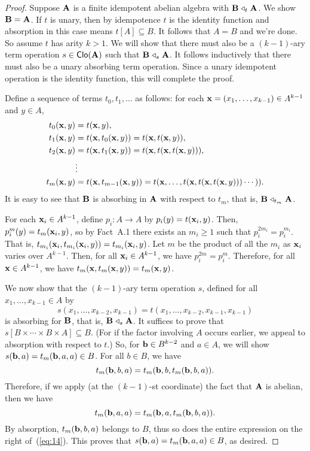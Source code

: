\begin{proof}
  Suppose $\mathbf{A}$ is a finite idempotent abelian algebra with $\mathbf{B} \mathrel{\triangleleft}_t \mathbf{A}$.
  We show $\mathbf{B} = \mathbf{A}$.
  If $t$ is unary, then by idempotence $t$ is the identity function and
  absorption in this case means $t[A] \subseteq B$.  It follows that $A = B$ and
  we're done.  So assume $t$ has arity $k>1$.  We
  will show that there must also be a $(k-1)$-ary term operation 
  $s\in \operatorname{\mathsf{Clo}}(\mathbf{A})$ such that $\mathbf{B} \mathrel{\triangleleft}_s \mathbf{A}$.  
  It follows inductively that there must also be a unary absorbing term
  operation. Since a unary idempotent operation is the identity
  function, this will complete the proof.

  Define a sequence of terms $t_0, t_1, \dots$ as follows:
  for each $\mathbf{x} = (x_1, \dots, x_{k-1}) \in A^{k-1}$ and $y\in A$,
  \begin{align*}
    t_0(\mathbf{x}, y) &= t(\mathbf{x}, y),\\
    t_1(\mathbf{x}, y) &= t(\mathbf{x}, t_0(\mathbf{x}, y)) = t(\mathbf{x}, t(\mathbf{x}, y)), \\
    t_2(\mathbf{x}, y) &= t(\mathbf{x}, t_1(\mathbf{x}, y)) = t(\mathbf{x}, t(\mathbf{x}, t(\mathbf{x}, y))),\\
     &\vdots\\
    t_m(\mathbf{x}, y) &= t(\mathbf{x}, t_{m-1}(\mathbf{x}, y)) 
                 = t(\mathbf{x}, \dots, t(\mathbf{x}, t(\mathbf{x}, t(\mathbf{x}, y))) \cdots )).
  \end{align*}
  It is easy to see that $\mathbf{B}$ is absorbing in $\mathbf{A}$ with respect to $t_m$, that
  is, $\mathbf{B} \mathrel{\triangleleft}_{t_m} \mathbf{A}$.  

  For each $\mathbf{x}_i\in A^{k-1}$, 
  define $p_i:A \rightarrow A$ by $p_i(y) = t(\mathbf{x}_i, y)$.  Then, 
  $p_i^m(y) = t_m(\mathbf{x}_i, y)$, so by
  Fact~A.1 %
  there exists an $m_i\geq 1$ such that 
   $p_i^{2m_i} = p_i^{m_i}$.  That is, 
  $t_{m_i}(\mathbf{x}_i,t_{m_i}(\mathbf{x}_i,y)) = t_{m_i}(\mathbf{x}_i,y)$.
  Let $m$ be the product of all the $m_i$ as $\mathbf{x}_i$ varies over $A^{k-1}$.
  Then, for all $\mathbf{x}_i \in A^{k-1}$, we have 
   $p_i^{2m} = p_i^{m}$.  Therefore, 
  for all $\mathbf{x} \in A^{k-1}$, we have 
  $t_{m}(\mathbf{x},t_{m}(\mathbf{x},y)) = t_{m}(\mathbf{x},y)$.

  We now show that the $(k-1)$-ary term operation $s$, defined for all 
  $x_1, \dots, x_{k-1} \in A$ by 
  \[
  s(x_1, \dots, x_{k-2}, x_{k-1})=
  t(x_1, \dots, x_{k-2}, x_{k-1}, x_{k-1})
  \]
  is absorbing for $\mathbf{B}$, that is, $\mathbf{B} \mathrel{\triangleleft}_{s} \mathbf{A}$.  It suffices to
  prove that $s[B \times \cdots \times B \times A] \subseteq B$. 
  (For if the factor involving $A$ occurs earlier, we appeal to
  absorption with respect to $t$.)
  So, for $\mathbf{b} \in B^{k-2}$ and $a\in A$, we will show 
  $s(\mathbf{b}, a) = t_m(\mathbf{b}, a,a) \in B$.  For all $b\in B$, we have
  \[
  t_m(\mathbf{b}, b, a) = t_m(\mathbf{b}, b, t_m(\mathbf{b}, b, a)).
  \]
  Therefore, if we apply (at the $(k-1)$-st coordinate) 
  the fact that $\mathbf{A}$ is abelian, then we have
  \begin{equation}
    \label{eq:14}
    t_m(\bb, a, a) = t_m(\bb, a, t_m(\bb, b, a)).
  \end{equation}
  By absorption, $t_m(\mathbf{b}, b, a)$ belongs to $B$, thus so does the
  entire expression on the right of~(\ref{eq:14}).  This proves that 
  $s(\mathbf{b}, a) = t_m(\mathbf{b}, a,a) \in B$, as desired.
\end{proof}
